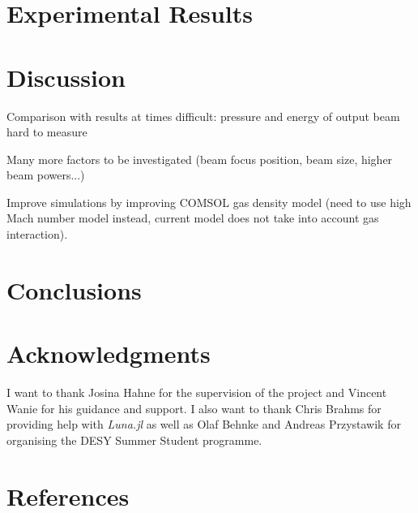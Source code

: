 \documentclass[a4paper]{jpconf}
\begin{document}




\section{Experimental Results}

\section{Discussion}
Comparison with results at times difficult: pressure and energy of output beam hard to measure


Many more factors to be investigated (beam focus position, beam size, higher beam powers...)


Improve simulations by improving COMSOL gas density model (need to use high Mach number model instead, current model does not take into account gas interaction). 

\section{Conclusions}

\section*{Acknowledgments}
I want to thank Josina Hahne for the supervision of the project and Vincent Wanie for his guidance and support. I also want to thank Chris Brahms for providing help with \textit{Luna.jl} as well as Olaf Behnke and Andreas Przystawik for organising the DESY Summer Student programme.  


\section*{References}


\end{document}
